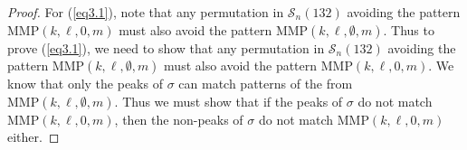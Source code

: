 \documentclass[
final,nomarks
]{dmtcs-episciences}
\newcommand{\Sn}[1]{\mathcal{S}_{#1}}
\newcommand{\MMP}{\mathrm{MMP}}
\begin{document}
\begin{proof}
	For (\ref{eq3.1}), note that any permutation in \begin{math}\Sn{n}(132)\end{math} avoiding the pattern \begin{math}\MMP(k,\ell,0,m)\end{math} must also avoid the pattern \begin{math}\MMP(k,\ell,\emptyset,m)\end{math}. Thus to prove (\ref{eq3.1}), we need to show 
	that any permutation in \begin{math}\Sn{n}(132)\end{math} avoiding the pattern \begin{math}\MMP(k,\ell,\emptyset,m)\end{math} must also avoid the pattern \begin{math}\MMP(k,\ell,0,m)\end{math}. We know that only the peaks of \begin{math}\sigma\end{math} can 
	match patterns of the from \begin{math}\MMP(k,\ell,\emptyset,m)\end{math}. Thus we must show that if 
	the peaks of \begin{math}\sigma\end{math} do not match \begin{math}\MMP(k,\ell,0,m)\end{math}, then the non-peaks of \begin{math}\sigma\end{math} do not match \begin{math}\MMP(k,\ell,0,m)\end{math} either.
	

\end{proof}
\end{document}
